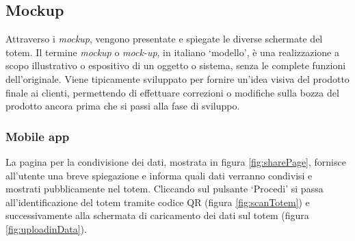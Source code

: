 \subsection{Mockup}
Attraverso i \textit{mockup}, vengono presentate e spiegate le diverse schermate del totem.
Il termine \textit{mockup} o \textit{mock-up}, in italiano \enquote*{modello}, è una realizzazione a scopo illustrativo o espositivo di un oggetto o sistema, senza le complete funzioni dell'originale. Viene tipicamente sviluppato per fornire un'idea visiva del prodotto finale ai clienti, permettendo di effettuare correzioni o modifiche sulla bozza del prodotto ancora prima che si passi alla fase di sviluppo.

\subsubsection{Mobile app}
La pagina per la condivisione dei dati, mostrata in figura \ref{fig:sharePage}, fornisce all'utente una breve spiegazione e informa quali dati verranno condivisi e mostrati pubblicamente nel totem.
Cliccando sul pulsante \enquote*{Procedi} si passa all'identificazione del totem tramite codice QR (figura \ref{fig:scanTotem}) e successivamente alla schermata di caricamento dei dati sul totem (figura \ref{fig:uploadinData}).
